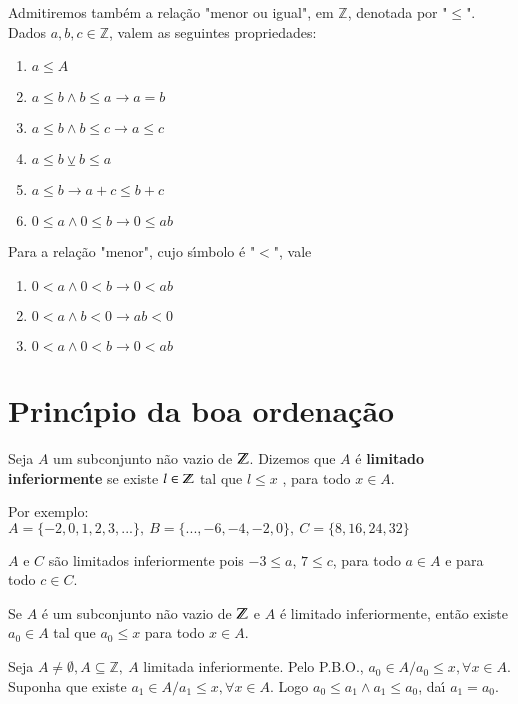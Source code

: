Admitiremos tamb{\'e}m a rela{\c c}{\~a}o "menor ou igual", em $\mathbb{Z}$, denotada por "$\leq$". Dados $a,b,c\in\mathbb{Z}$, valem as seguintes propriedades:
\begin{enumerate}
\item $a\leq A$
\item $a\leq b\wedge b\leq a\rightarrow a=b$
\item $a\leq b\wedge b\leq c\rightarrow a\leq c$
\item $a\leq b\veebar b\leq a$
\item $a\leq b\rightarrow a+c\leq b+c$
\item $0\leq a\wedge 0\leq b\rightarrow 0\leq ab$
\end{enumerate}

Para a rela{\c c}{\~a}o "menor", cujo s{\'\i}mbolo {\'e} "$<$", vale
\begin{enumerate}
\item $0<a\wedge 0<b\rightarrow 0<ab$
\item $0<a\wedge b<0\rightarrow ab<0$
\item $0<a\wedge 0<b\rightarrow 0<ab$
\end{enumerate}

\section{Princ{\'\i}pio da boa ordena{\c c}{\~a}o}

\begin{definicao} 
	Seja $A$ um subconjunto n{\~a}o vazio de $\mathbb{Z}$. Dizemos que $A$ {\'e} \textbf{limitado inferiormente} se existe $l \in \mathbb{Z}$ tal que $l \leq x$
	, para todo $x\in A$.
\end{definicao}

Por exemplo:\\
$A=\{-2,0,1,2,3,...\},\ B=\{...,-6,-4,-2,0\},\ C=\{8,16,24,32\}$

$A$ e $C$ s{\~a}o limitados inferiormente pois $-3\leq a$, $7\leq c$, para todo $a\in A$ e para todo $c\in C$.

\begin{definicao}
	Se $A$ {\'e} um subconjunto n{\~a}o vazio de $\mathbb{Z}$ e $A$ {\'e} limitado inferiormente, ent{\~a}o existe $a_{0}\in A$ tal que $a_{0}\leq x$ para todo $x\in A$.	
\end{definicao}

Seja $A\neq\emptyset, A\subseteq\mathbb{Z},\ A$ limitada inferiormente. Pelo P.B.O., $a_{0}\in A/a_{0}\leq x,\forall x\in A$. Suponha que existe $a_{1}\in A/a_{1}\leq x, \forall x\in A$. Logo $a_{0}\leq a_{1}\wedge a_{1}\leq a_{0}$, da{\'\i} $a_{1}=a_{0}$.\\

